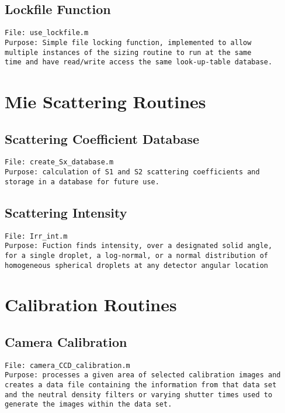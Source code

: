\pagebreak
\subsection{Lockfile Function}
\begin{verbatim} 
File: use_lockfile.m
Purpose: Simple file locking function, implemented to allow 
multiple instances of the sizing routine to run at the same 
time and have read/write access the same look-up-table database.
\end{verbatim}




\pagebreak
\section{Mie Scattering Routines}
\subsection{Scattering Coefficient Database}
\begin{verbatim} 
File: create_Sx_database.m
Purpose: calculation of S1 and S2 scattering coefficients and 
storage in a database for future use.
\end{verbatim}


\pagebreak

\subsection{Scattering Intensity}
\label{Irr_int_function}
\begin{verbatim} 
File: Irr_int.m
Purpose: Fuction finds intensity, over a designated solid angle, 
for a single droplet, a log-normal, or a normal distribution of 
homogeneous spherical droplets at any detector angular location
\end{verbatim}



\pagebreak
\section{Calibration Routines}
\label{calibration_routines}

\subsection{Camera Calibration}
\begin{verbatim} 
File: camera_CCD_calibration.m
Purpose: processes a given area of selected calibration images and 
creates a data file containing the information from that data set 
and the neutral density filters or varying shutter times used to 
generate the images within the data set.
\end{verbatim}

